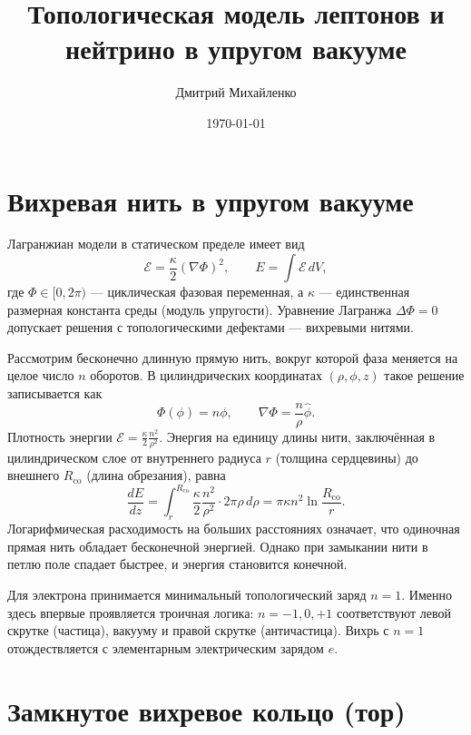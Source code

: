 \documentclass[12pt,a4paper]{article}
\title{Топологическая модель лептонов и нейтрино в упругом вакууме}
\author{Дмитрий Михайленко}
\date{\today}
\begin{document}
\maketitle

\section{Вихревая нить в упругом вакууме}

Лагранжиан модели в статическом пределе имеет вид
\begin{equation}
\mathcal{E} = \frac{\kappa}{2} (\nabla \Phi)^2, \qquad
E = \int \mathcal{E} \, dV,
\label{eq:lagrangian}
\end{equation}
где $\Phi \in [0, 2\pi)$ — циклическая фазовая переменная, а $\kappa$ — единственная размерная константа среды (модуль упругости). Уравнение Лагранжа $\Delta\Phi = 0$ допускает решения с топологическими дефектами — вихревыми нитями.

Рассмотрим бесконечно длинную прямую нить, вокруг которой фаза меняется на целое число $n$ оборотов. В цилиндрических координатах $(\rho, \phi, z)$ такое решение записывается как
\begin{equation}
\Phi(\phi) = n\phi, \qquad
\nabla\Phi = \frac{n}{\rho} \hat{\phi}.
\label{eq:vortex}
\end{equation}
Плотность энергии $\mathcal{E} = \frac{\kappa}{2} \frac{n^2}{\rho^2}$. Энергия на единицу длины нити, заключённая в цилиндрическом слое от внутреннего радиуса $r$ (толщина сердцевины) до внешнего $R_{\text{co}}$ (длина обрезания), равна
\begin{equation}
\frac{dE}{dz} = \int_{r}^{R_{\text{co}}}
\frac{\kappa}{2} \frac{n^2}{\rho^2} \cdot 2\pi\rho \, d\rho
= \pi \kappa n^2 \ln\frac{R_{\text{co}}}{r}.
\label{eq:energy_density}
\end{equation}
Логарифмическая расходимость на больших расстояниях означает, что одиночная прямая нить обладает бесконечной энергией. Однако при замыкании нити в петлю поле спадает быстрее, и энергия становится конечной.

Для электрона принимается минимальный топологический заряд $n = 1$. Именно здесь впервые проявляется троичная логика: $n = -1, 0, +1$ соответствуют левой скрутке (частица), вакууму и правой скрутке (античастица). Вихрь с $n = 1$ отождествляется с элементарным электрическим зарядом $e$.

\section{Замкнутое вихревое кольцо (тор)}
\end{document}
